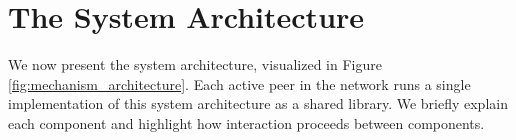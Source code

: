 %	
%	
%	


\section{The \ModelName{} System Architecture}
\label{sec:architecture}
We now present the \ModelName{} system architecture, visualized in Figure \ref{fig:mechanism_architecture}.
Each active peer in the \ModelName{} network runs a single implementation of this system architecture as a shared library.
We briefly explain each component and highlight how interaction proceeds between components.


